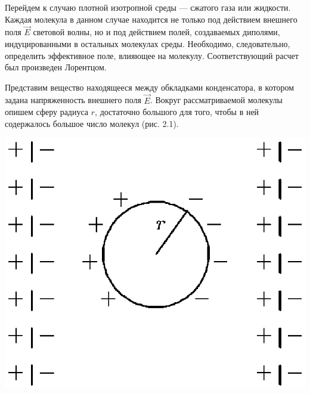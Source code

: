 Перейдем к случаю плотной изотропной среды --- сжатого газа или
жидкости. Каждая молекула в данном случае находится не только под
действием внешнего поля $\vec E$ световой волны, но и под
действием полей, создаваемых диполями, индуцированными в остальных
молекулах среды. Необходимо, следовательно, определить эффективное
поле, влияющее на молекулу. Соответствующий расчет был произведен
Лорентцом.

Представим вещество находящееся между обкладками конденсатора, в
котором задана напряженность внешнего поля $\vec E$. Вокруг
рассматриваемой молекулы опишем сферу радиуса $r$, достаточно
большого для того, чтобы в ней содержалось большое число молекул
(рис. 2.1).

\vskip 3mm
\centerline{\hbox{\includegraphics[scale=0.7]{Ris/ris_eps/ris2_01.eps}}}

